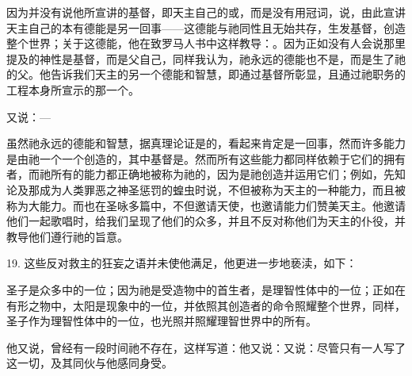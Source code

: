 因为并没有说他所宣讲的基督，即天主自己的或，而是没有用冠词，说，由此宣讲天主自己的本有德能是另一回事——这德能与祂同性且无始共存，生发基督，创造整个世界；关于这德能，他在致罗马人书中这样教导：。因为正如没有人会说那里提及的神性是基督，而是父自己，同样我认为，祂永远的德能也不是，而是生了祂的父。他告诉我们天主的另一个德能和智慧，即通过基督所彰显，且通过祂职务的工程本身所宣示的那一个。\par

又说：—\par

虽然祂永远的德能和智慧，据真理论证是的，看起来肯定是一回事，然而许多能力是由祂一个一个创造的，其中基督是。然而所有这些能力都同样依赖于它们的拥有者，而祂所有的能力都正确地被称为祂的，因为是祂创造并运用它们；例如，先知论及那成为人类罪恶之神圣惩罚的蝗虫时说，不但被称为天主的一种能力，而且被称为大能力。而也在圣咏多篇中，不但邀请天使，也邀请能力们赞美天主。他邀请他们一起歌唱时，给我们呈现了他们的众多，并且不反对称他们为天主的仆役，并教导他们遵行祂的旨意。\par

19. 这些反对救主的狂妄之语并未使他满足，他更进一步地亵渎，如下：\par

圣子是众多中的一位；因为祂是受造物中的首生者，是理智性体中的一位；正如在有形之物中，太阳是现象中的一位，并依照其创造者的命令照耀整个世界，同样，圣子作为理智性体中的一位，也光照并照耀理智世界中的所有。\par

他又说，曾经有一段时间祂不存在，这样写道：他又说：又说：尽管只有一人写了这一切，及其同伙与他感同身受。\par

